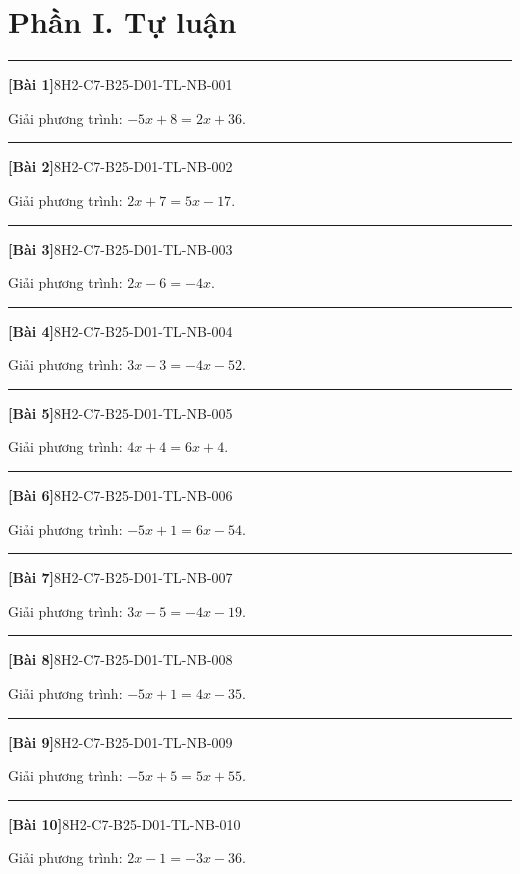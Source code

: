 \documentclass[12pt,a4paper]{article}
\newif\ifloigiai
\newenvironment{cauhoi}[2]{%
  \par\medskip\noindent\rule{\textwidth}{0.4pt}\par\nopagebreak
  \noindent\textbf{[#1]}\hfill{\scriptsize\ttfamily #2}\par\nopagebreak\smallskip}{\par}
\newcommand{\loigiai}[1]{\ifloigiai\par\smallskip\noindent\textit{Lời giải.} #1\par\fi}
\begin{document}
\section*{Phần I. Tự luận}
\begin{cauhoi}{Bài 1}{8H2-C7-B25-D01-TL-NB-001}
Giải phương trình: $-5x + 8=2x + 36$.
\loigiai{$-5x + 8=2x + 36$ nên $-7x=28$ (chuyển vế), suy ra $x=-4$.}
\end{cauhoi}
\begin{cauhoi}{Bài 2}{8H2-C7-B25-D01-TL-NB-002}
Giải phương trình: $2x + 7=5x - 17$.
\loigiai{$2x + 7=5x - 17$ nên $-3x=-24$ (chuyển vế), suy ra $x=8$.}
\end{cauhoi}
\begin{cauhoi}{Bài 3}{8H2-C7-B25-D01-TL-NB-003}
Giải phương trình: $2x - 6=-4x$.
\loigiai{$2x - 6=-4x$ nên $6x=6$ (chuyển vế), suy ra $x=1$.}
\end{cauhoi}
\begin{cauhoi}{Bài 4}{8H2-C7-B25-D01-TL-NB-004}
Giải phương trình: $3x - 3=-4x - 52$.
\loigiai{$3x - 3=-4x - 52$ nên $7x=-49$ (chuyển vế), suy ra $x=-7$.}
\end{cauhoi}
\begin{cauhoi}{Bài 5}{8H2-C7-B25-D01-TL-NB-005}
Giải phương trình: $4x + 4=6x + 4$.
\loigiai{$4x + 4=6x + 4$ nên $-2x=0$ (chuyển vế), suy ra $x=0$.}
\end{cauhoi}
\begin{cauhoi}{Bài 6}{8H2-C7-B25-D01-TL-NB-006}
Giải phương trình: $-5x + 1=6x - 54$.
\loigiai{$-5x + 1=6x - 54$ nên $-11x=-55$ (chuyển vế), suy ra $x=5$.}
\end{cauhoi}
\begin{cauhoi}{Bài 7}{8H2-C7-B25-D01-TL-NB-007}
Giải phương trình: $3x - 5=-4x - 19$.
\loigiai{$3x - 5=-4x - 19$ nên $7x=-14$ (chuyển vế), suy ra $x=-2$.}
\end{cauhoi}
\begin{cauhoi}{Bài 8}{8H2-C7-B25-D01-TL-NB-008}
Giải phương trình: $-5x + 1=4x - 35$.
\loigiai{$-5x + 1=4x - 35$ nên $-9x=-36$ (chuyển vế), suy ra $x=4$.}
\end{cauhoi}
\begin{cauhoi}{Bài 9}{8H2-C7-B25-D01-TL-NB-009}
Giải phương trình: $-5x + 5=5x + 55$.
\loigiai{$-5x + 5=5x + 55$ nên $-10x=50$ (chuyển vế), suy ra $x=-5$.}
\end{cauhoi}
\begin{cauhoi}{Bài 10}{8H2-C7-B25-D01-TL-NB-010}
Giải phương trình: $2x - 1=-3x - 36$.
\loigiai{$2x - 1=-3x - 36$ nên $5x=-35$ (chuyển vế), suy ra $x=-7$.}
\end{cauhoi}
\end{document}

